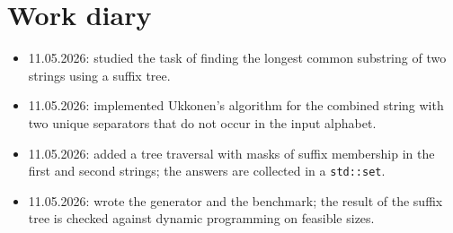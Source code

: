 \section{Work diary}

\begin{itemize}
    \item 11.05.2026: studied the task of finding the longest common substring of two strings
    using a suffix tree.
    \item 11.05.2026: implemented Ukkonen's algorithm for the combined string with two unique
    separators that do not occur in the input alphabet.
    \item 11.05.2026: added a tree traversal with masks of suffix membership in the first
    and second strings; the answers are collected in a \texttt{std::set}.
    \item 11.05.2026: wrote the generator and the benchmark; the result of the suffix tree is
    checked against dynamic programming on feasible sizes.
\end{itemize}

\pagebreak
